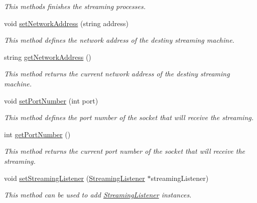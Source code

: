 \begin{DoxyCompactItemize}
\begin{DoxyCompactList}\small\item\em This methods finishes the streaming processes. \item\end{DoxyCompactList}\item 
void \hyperlink{classbr_1_1ufscar_1_1lince_1_1xpta_1_1streaming_1_1StreamingProvider_a2d1a5f1906bd18a9a307d138982c5426}{setNetworkAddress} (string address)
\begin{DoxyCompactList}\small\item\em This method defines the network address of the destiny streaming machine. \item\end{DoxyCompactList}\item 
string \hyperlink{classbr_1_1ufscar_1_1lince_1_1xpta_1_1streaming_1_1StreamingProvider_afc775d9f2e59a95f2b7f6174b0dfaec7}{getNetworkAddress} ()
\begin{DoxyCompactList}\small\item\em This method returns the current network address of the destiny streaming machine. \item\end{DoxyCompactList}\item 
void \hyperlink{classbr_1_1ufscar_1_1lince_1_1xpta_1_1streaming_1_1StreamingProvider_a2ff06395159cbe67ff5431e9c81df31e}{setPortNumber} (int port)
\begin{DoxyCompactList}\small\item\em This method defines the port number of the socket that will receive the streaming. \item\end{DoxyCompactList}\item 
int \hyperlink{classbr_1_1ufscar_1_1lince_1_1xpta_1_1streaming_1_1StreamingProvider_ac909e10bd3de4a717302b52bf28e47ca}{getPortNumber} ()
\begin{DoxyCompactList}\small\item\em This method returns the current port number of the socket that will receive the streaming. \item\end{DoxyCompactList}\item 
void \hyperlink{classbr_1_1ufscar_1_1lince_1_1xpta_1_1streaming_1_1StreamingProvider_aba9b16a248950888bbade4fb80347933}{setStreamingListener} (\hyperlink{classbr_1_1ufscar_1_1lince_1_1xpta_1_1streaming_1_1StreamingListener}{StreamingListener} $\ast$streamingListener)
\begin{DoxyCompactList}\small\item\em This method can be used to add \hyperlink{classbr_1_1ufscar_1_1lince_1_1xpta_1_1streaming_1_1StreamingListener}{StreamingListener} instances. \item\end{DoxyCompactList}\item 

\end{DoxyCompactItemize}
